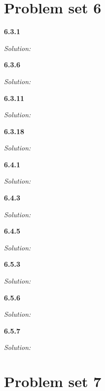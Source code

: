 \documentclass{book}
\theoremstyle{definition}
\begin{document}
\newpage










\section{Problem set 6}





\noindent \textbf{6.3.1}


\noindent \textit{Solution:} 


\newpage



\noindent \textbf{6.3.6}


\noindent \textit{Solution:} 


\newpage
\noindent \textbf{6.3.11}


\noindent \textit{Solution:} 


\newpage
\noindent \textbf{6.3.18}


\noindent \textit{Solution:} 


\newpage
\noindent \textbf{6.4.1}


\noindent \textit{Solution:} 


\newpage
\noindent \textbf{6.4.3}


\noindent \textit{Solution:} 


\newpage
\noindent \textbf{6.4.5}


\noindent \textit{Solution:} 


\newpage
\noindent \textbf{6.5.3}


\noindent \textit{Solution:} 


\newpage
\noindent \textbf{6.5.6}


\noindent \textit{Solution:} 


\newpage
\noindent \textbf{6.5.7}


\noindent \textit{Solution:} 


\newpage



\section{Problem set 7}




	
	
\end{document}
